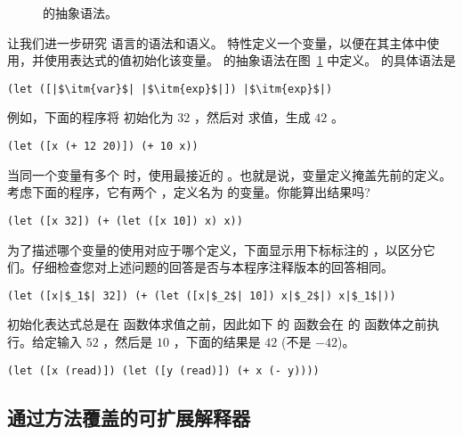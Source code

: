 \documentclass[11pt]{book}
\begin{document}
\begin{figure}[tp]
\centering
{}
\caption{ \LangVar{} 的抽象语法。}
\label{fig:r1-syntax}
\end{figure}

让我们进一步研究 \LangVar{}
语言的语法和语义。  特性定义一个变量，以便在其主体中使用，并使用表达式的值初始化该变量。  的抽象语法在图~\ref{fig:r1-syntax} 中定义。  的具体语法是
\begin{lstlisting}
(let ([|$\itm{var}$| |$\itm{exp}$|]) |$\itm{exp}$|)
\end{lstlisting}
例如，下面的程序将  初始化为 $32$ ，然后对  求值，生成 $42$ 。
\begin{lstlisting}
(let ([x (+ 12 20)]) (+ 10 x))
\end{lstlisting}
当同一个变量有多个  时，使用最接近的  。也就是说，变量定义掩盖先前的定义。考虑下面的程序，它有两个  ，定义名为  的变量。你能算出结果吗?
\begin{lstlisting}
(let ([x 32]) (+ (let ([x 10]) x) x))
\end{lstlisting}
为了描述哪个变量的使用对应于哪个定义，下面显示用下标标注的  ，以区分它们。仔细检查您对上述问题的回答是否与本程序注释版本的回答相同。
\begin{lstlisting}
(let ([x|$_1$| 32]) (+ (let ([x|$_2$| 10]) x|$_2$|) x|$_1$|))
\end{lstlisting}
初始化表达式总是在
 函数体求值之前，因此如下  的  函数会在  的  函数体之前执行。给定输入
$52$ ，然后是 $10$ ，下面的结果是 $42$ (不是 $-42$)。
\begin{lstlisting}
(let ([x (read)]) (let ([y (read)]) (+ x (- y))))
\end{lstlisting}

\subsection{通过方法覆盖的可扩展解释器}
\label{sec:extensible-interp}
\end{document}
